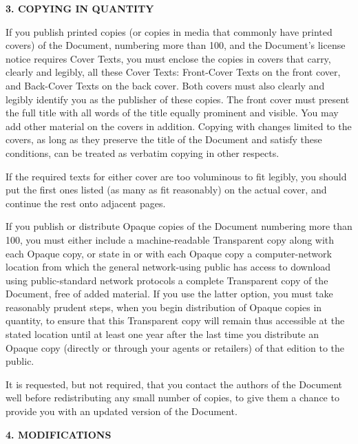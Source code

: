 \documentclass[]{report}
\theoremstyle{definition}
\theoremstyle{remark}
\theoremstyle{plain}
\numberwithin{equation}{chapter}
\begin{document}
\begin{multicols*}{2}
\begin{center}
	{\footnotesize\bf 3. COPYING IN QUANTITY\par}
\end{center}


If you publish printed copies (or copies in media that commonly have
printed covers) of the Document, numbering more than 100, and the
Document's license notice requires Cover Texts, you must enclose the
copies in covers that carry, clearly and legibly, all these Cover
Texts: Front-Cover Texts on the front cover, and Back-Cover Texts on
the back cover.  Both covers must also clearly and legibly identify
you as the publisher of these copies.  The front cover must present
the full title with all words of the title equally prominent and
visible.  You may add other material on the covers in addition.
Copying with changes limited to the covers, as long as they preserve
the title of the Document and satisfy these conditions, can be treated
as verbatim copying in other respects.

If the required texts for either cover are too voluminous to fit
legibly, you should put the first ones listed (as many as fit
reasonably) on the actual cover, and continue the rest onto adjacent
pages.

If you publish or distribute Opaque copies of the Document numbering
more than 100, you must either include a machine-readable Transparent
copy along with each Opaque copy, or state in or with each Opaque copy
a computer-network location from which the general network-using
public has access to download using public-standard network protocols
a complete Transparent copy of the Document, free of added material.
If you use the latter option, you must take reasonably prudent steps,
when you begin distribution of Opaque copies in quantity, to ensure
that this Transparent copy will remain thus accessible at the stated
location until at least one year after the last time you distribute an
Opaque copy (directly or through your agents or retailers) of that
edition to the public.

It is requested, but not required, that you contact the authors of the
Document well before redistributing any small number of copies, to give
them a chance to provide you with an updated version of the Document.


\begin{center}
	{\footnotesize\bf 4. MODIFICATIONS\par}
\end{center}


\end{multicols*}
\end{document}
